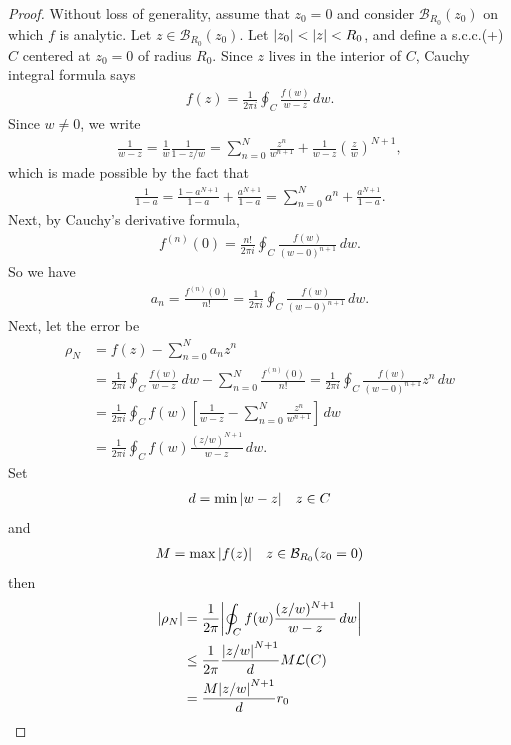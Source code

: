 \documentclass{article}
\theoremstyle{definition}
\newcommand{\f}[2]{\frac{#1}{#2}}
\newcommand{\B}{\mathcal{B}}
\newcommand{\lag}{\mathcal{L}}
\newcommand{\lp}{\left(}
\newcommand{\rp}{\right)}
\newcommand{\lb}{\left[}
\newcommand{\rb}{\right]}
\newcommand{\nn}{\nonumber}
\begin{document}
\begin{proof}
	Without loss of generality, assume that $z_0 = 0$ and consider $\B_{R_0}(z_0)$ on which $f$ is analytic. Let $z \in \B_{R_0}(z_0)$. Let $\abs{z_0} < \abs{z} < R_0$, and define a s.c.c.(+) $C$ centered at $z_0 = 0$ of radius $R_0$. Since $z$ lives in the interior of $C$, Cauchy integral formula says
	\begin{align}
	f(z) = \f{1}{2\pi i}\oint_C \f{f(w)}{w-z}\,dw.
	\end{align}
	Since $w \neq 0$, we write
	\begin{align}
	\f{1}{w-z} = \f{1}{w}\f{1}{1 - z/w} = \sum^N_{n=0}\f{z^n}{w^{n+1}} + \f{1}{w-z}\lp\f{z}{w}\rp^{N+1},
	\end{align}
	which is made possible by the fact that
	\begin{align}
	\f{1}{1-a} = \f{1 - a^{N+1}}{1 - a} + \f{a^{N+1}}{1-a} = \sum^N_{n=0}a^n + \f{a^{N+1}}{1-a}.
	\end{align}
	Next, by Cauchy's derivative formula,
	\begin{align}
	f^{(n)}(0) = \f{n!}{2\pi i}\oint_{C}\f{f(w)}{(w - 0)^{n+1}}\,dw.
	\end{align}
	So we have
	\begin{align}
	a_n = \f{f^{(n)}(0)}{n!} = \f{1}{2\pi i}\oint_{C}\f{f(w)}{(w - 0)^{n+1}}\,dw.
	\end{align}
	Next, let the error be
	\begin{align}
	\rho_N  &= f(z) -  \sum^N_{n=0} a_nz^n \nn\\
	&= \f{1}{2\pi i}\oint_C \f{f(w)}{w-z}\,dw  -  \sum^N_{n=0}\f{f^{(n)}(0)}{n!} = \f{1}{2\pi i}\oint_{C}\f{f(w)}{(w - 0)^{n+1}}z^n\,dw \nn\\
	&= \f{1}{2\pi i}\oint_C f(w)\lb \f{1}{w-z} - \sum^N_{n=0}\f{z^n}{w^{n+1}} \rb\,dw\nn\\
	&= \f{1}{2\pi i}\oint_C f(w) \f{(z/w)^{N+1}}{w-z}\,dw.
	\end{align}
	Set 
	\begin{align}
	d = \min\abs{w-z} \quad z \in C
	\end{align}
	and
	\begin{align}
	M = \max \abs{f(z)} \quad z\in \B_{R_0}(z_0 = 0)
	\end{align}
	then 
	\begin{align}
	\abs{\rho_N} &= \f{1}{2\pi} \abs{\oint_C  f(w) \f{(z/w)^{N+1}}{w-z}\,dw} \nn\\
	&\leq \f{1}{2\pi} \f{\abs{z/w}^{N+1}}{d}M \lag(C)\nn\\
	&= \f{M \abs{z/w}^{N+1}}{d}r_0

\end{align}
\end{proof}
\end{document}
